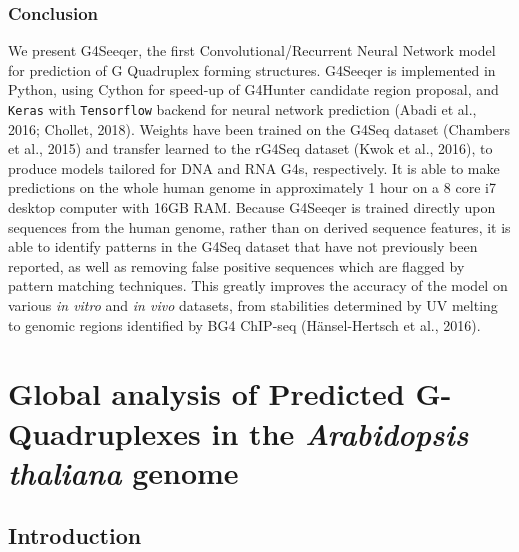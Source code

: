 \documentclass[12pt,a4paper,]{report}
\begin{document}
\newpage

\hypertarget{conclusion}{%
\subsection{Conclusion}\label{conclusion}}

We present G4Seeqer, the first Convolutional/Recurrent Neural Network
model for prediction of G Quadruplex forming structures. G4Seeqer is
implemented in Python, using Cython for speed-up of G4Hunter candidate
region proposal, and \texttt{Keras} with \texttt{Tensorflow} backend for
neural network prediction (Abadi et al., 2016; Chollet, 2018). Weights
have been trained on the G4Seq dataset (Chambers et al., 2015) and
transfer learned to the rG4Seq dataset (Kwok et al., 2016), to produce
models tailored for DNA and RNA G4s, respectively. It is able to make
predictions on the whole human genome in approximately 1 hour on a 8
core i7 desktop computer with 16GB RAM. Because G4Seeqer is trained
directly upon sequences from the human genome, rather than on derived
sequence features, it is able to identify patterns in the G4Seq dataset
that have not previously been reported, as well as removing false
positive sequences which are flagged by pattern matching techniques.
This greatly improves the accuracy of the model on various \emph{in
vitro} and \emph{in vivo} datasets, from stabilities determined by UV
melting to genomic regions identified by BG4 ChIP-seq (Hänsel-Hertsch et
al., 2016).

\newpage

\hypertarget{global-analysis-of-predicted-g-quadruplexes-in-the-arabidopsis-thaliana-genome}{%
\chapter{\texorpdfstring{Global analysis of Predicted G-Quadruplexes in
the \emph{Arabidopsis thaliana}
genome}{Global analysis of Predicted G-Quadruplexes in the Arabidopsis thaliana genome}}\label{global-analysis-of-predicted-g-quadruplexes-in-the-arabidopsis-thaliana-genome}}

\label{chap:g4_distribution}

\hypertarget{introduction-2}{%
\section{Introduction}\label{introduction-2}}
\end{document}
